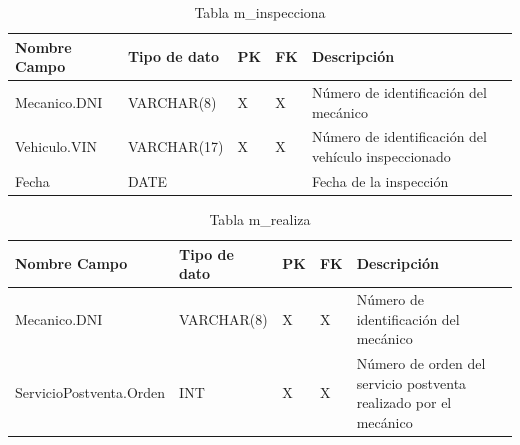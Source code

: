 \documentclass[12pt]{article}
\begin{document}
\begin{table}[htbp]
    \begin{center}
        \begin{tabular}{|p{3cm}|p{3cm}|p{1cm}|p{1cm}|p{6cm}|}
            \hline
            Nombre Campo & Tipo de dato & PK & FK & Descripción \\
            \hline
            Mecanico.DNI & VARCHAR(8) & X & X & Número de identificación del mecánico \\
            Vehiculo.VIN & VARCHAR(17) & X & X & Número de identificación del vehículo inspeccionado \\
            Fecha & DATE &  &  & Fecha de la inspección \\
            \hline
        \end{tabular}
        \caption{Tabla m\_inspecciona}
        \label{tab:tablas}
    \end{center}
\end{table}


\begin{table}[htbp]
    \begin{center}
        \begin{tabular}{|p{5cm}|p{3cm}|p{1cm}|p{1cm}|p{4cm}|}
            \hline
            Nombre Campo & Tipo de dato & PK & FK & Descripción \\
            \hline
            Mecanico.DNI & VARCHAR(8) & X & X & Número de identificación del mecánico \\
            ServicioPostventa.Orden & INT & X & X & Número de orden del servicio postventa realizado por el mecánico \\
            \hline
            \end{tabular}
        \caption{Tabla m\_realiza}
        \label{tab:tablas}
    \end{center}
\end{table}
\end{document}
